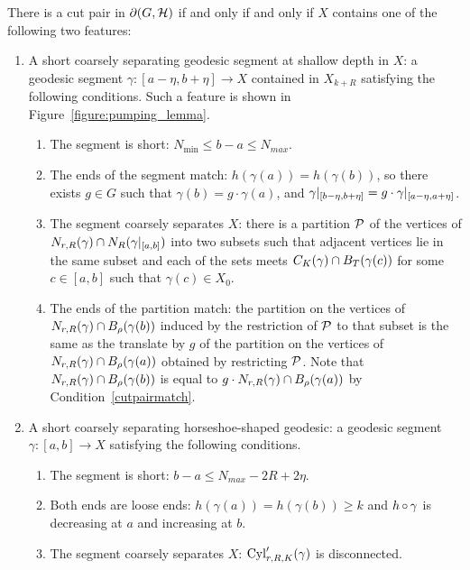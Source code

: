 \begin{theorem}\label{theorem:cut_pair_feature} 
  There is a cut pair in $\partial(G, \mathcal{H})$ if and only if and only if $X$ contains one of the following two features:
\begin{enumerate}
  \item A short coarsely separating geodesic segment at shallow depth in $X$: a geodesic segment $\gamma \colon [a - \eta, b + \eta] \to X$ contained in $X_{k + R}$ satisfying the following conditions.
    Such a feature is shown in Figure~\ref{figure:pumping_lemma}.
  \begin{enumerate}
    \item\label{cutpairshort} The segment is short: $N_\text{min} \leq b - a \leq N_{max}$.
    \item\label{cutpairmatch} The ends of the segment match: $h(\gamma(a)) = h(\gamma(b))$, so there exists $g \in G$ such that $\gamma(b) = g \cdot \gamma(a)$, and $\gamma\vert_{[b - \eta, b + \eta]} = g\cdot \gamma\vert_{[a - \eta, a + \eta]}$.
    \item\label{cutpairnontrivial} The segment coarsely separates $X$: there is a partition $\mathcal{P}$ of the vertices of $N_{r, R}(\gamma) \cap N_R(\gamma\vert_{[a,b]})$ into two subsets such that adjacent vertices lie in the same subset and each of the sets meets $C_K(\gamma) \cap B_{T}(\gamma(c))$ for some $c \in [a, b]$ such that $\gamma(c) \in X_0$.
    \item\label{cutpairpartition} The ends of the partition match: the partition on the vertices of $N_{r, R}(\gamma) \cap B_{{\rho}}(\gamma(b))$ induced by the restriction of $\mathcal{P}$ to that subset is the same as the translate by $g$ of the partition on the vertices of $N_{r, R}(\gamma) \cap B_{{\rho}}(\gamma(a))$ obtained by restricting $\mathcal{P}$. 
      Note that $N_{r, R}(\gamma) \cap B_{\rho}(\gamma(b))$ is equal to $g \cdot N_{r, R}(\gamma) \cap B_{\rho}(\gamma(a))$ by Condition~\ref{cutpairmatch}.
  \end{enumerate} 
  \item A short coarsely separating horseshoe-shaped geodesic: a geodesic segment $\gamma \colon [a, b] \to X$ satisfying the following conditions.
  \begin{enumerate}
    \item The segment is short: $b - a \leq N_{max} - 2R + 2\eta$.
    \item Both ends are loose ends: $h(\gamma(a)) = h(\gamma(b)) \geq k$ and $h \operatorname{\circ} \gamma$ is decreasing at $a$ and increasing at $b$.
    \item The segment coarsely separates $X$: $\operatorname{Cyl}'_{r, R, K}(\gamma)$ is disconnected.
  \end{enumerate}
\end{enumerate}
\end{theorem}

